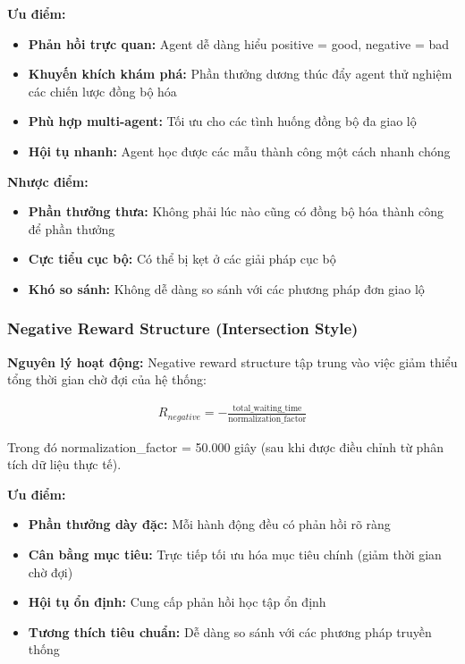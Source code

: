 \textbf{Ưu điểm:}
\begin{itemize}
    \item \textbf{Phản hồi trực quan:} Agent dễ dàng hiểu positive = good, negative = bad

    \item \textbf{Khuyến khích khám phá:} Phần thưởng dương thúc đẩy agent thử nghiệm các chiến lược đồng bộ hóa

    \item \textbf{Phù hợp multi-agent:} Tối ưu cho các tình huống đồng bộ đa giao lộ

    \item \textbf{Hội tụ nhanh:} Agent học được các mẫu thành công một cách nhanh chóng
\end{itemize}

\textbf{Nhược điểm:}
\begin{itemize}
    \item \textbf{Phần thưởng thưa:} Không phải lúc nào cũng có đồng bộ hóa thành công để phần thưởng

    \item \textbf{Cực tiểu cục bộ:} Có thể bị kẹt ở các giải pháp cục bộ

    \item \textbf{Khó so sánh:} Không dễ dàng so sánh với các phương pháp đơn giao lộ
\end{itemize}

\subsubsection{Negative Reward Structure (Intersection Style)}

\textbf{Nguyên lý hoạt động:} Negative reward structure tập trung vào việc giảm
thiểu tổng thời gian chờ đợi của hệ thống:

\begin{align}
    R_{negative} = -\frac{\text{total\_waiting\_time}}{\text{normalization\_factor}}
\end{align}

Trong đó normalization\_factor = 50.000 giây (sau khi được điều chỉnh từ phân
tích dữ liệu thực tế).

\textbf{Ưu điểm:}
\begin{itemize}
    \item \textbf{Phần thưởng dày đặc:} Mỗi hành động đều có phản hồi rõ ràng

    \item \textbf{Cân bằng mục tiêu:} Trực tiếp tối ưu hóa mục tiêu chính (giảm
        thời gian chờ đợi)

    \item \textbf{Hội tụ ổn định:} Cung cấp phản hồi học tập ổn định

    \item \textbf{Tương thích tiêu chuẩn:} Dễ dàng so sánh với các phương pháp
        truyền thống
\end{itemize}

